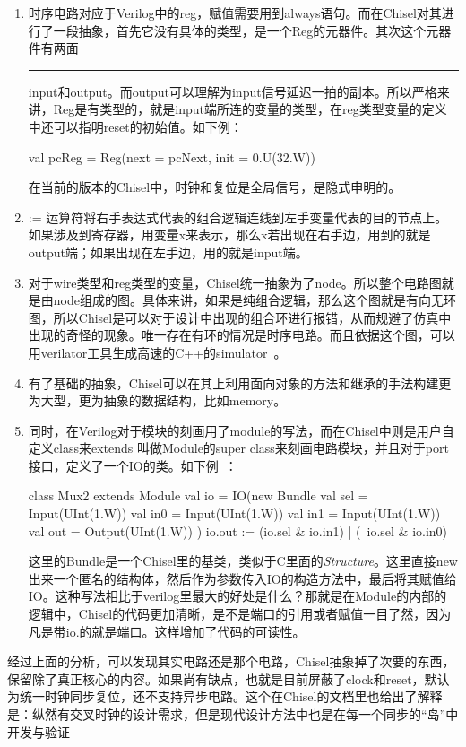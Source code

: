 \documentclass{article}
\newcommand{\chinesedash}{\rule[.7ex]{\widthof{二字}}{0.5pt}}
\begin{document}
\begin{enumerate}
\begin{itemize}
	\end{itemize}
	\item 时序电路对应于Verilog中的reg，赋值需要用到always语句。而在Chisel对其进行了一段抽象，首先它没有具体的类型，是一个Reg的元器件。其次这个元器件有两面\chinesedash input和output。而output可以理解为input信号延迟一拍的副本。所以严格来讲，Reg是有类型的，就是input端所连的变量的类型，在reg类型变量的定义中还可以指明reset的初始值。如下例：
	\begin{scala}
		val pcReg = Reg(next = pcNext, init = 0.U(32.W))
	\end{scala}
	在当前的版本的Chisel中，时钟和复位是全局信号，是隐式申明的。~\cite{chisel}
	\item := 运算符将右手表达式代表的组合逻辑连线到左手变量代表的目的节点上。如果涉及到寄存器，用变量x来表示，那么x若出现在右手边，用到的就是output端；如果出现在左手边，用的就是input端。~\cite{chisel}
	\item 对于wire类型和reg类型的变量，Chisel统一抽象为了node。所以整个电路图就是由node组成的图。具体来讲，如果是纯组合逻辑，那么这个图就是有向无环图，所以Chisel是可以对于设计中出现的组合环进行报错，从而规避了仿真中出现的奇怪的现象。唯一存在有环的情况是时序电路。而且依据这个图，可以用verilator工具生成高速的C++的simulator~\cite{chisel}。
	\item 有了基础的抽象，Chisel可以在其上利用面向对象的方法和继承的手法构建更为大型，更为抽象的数据结构，比如memory。
	\item 同时，在Verilog对于模块的刻画用了module的写法，而在Chisel中则是用户自定义class来extends 叫做Module的super class来刻画电路模块，并且对于port接口，定义了一个IO的类。如下例~\cite{chisel}：
	\begin{scala}
	class Mux2 extends Module {
		val io = IO(new Bundle{
			val sel = Input(UInt(1.W))
			val in0 = Input(UInt(1.W))
			val in1 = Input(UInt(1.W))
			val out = Output(UInt(1.W))
		})
		io.out := (io.sel & io.in1) | (~io.sel & io.in0)
	}
	\end{scala}
	这里的Bundle是一个Chisel里的基类，类似于C里面的\textit{Structure}。这里直接new出来一个匿名的结构体，然后作为参数传入IO的构造方法中，最后将其赋值给IO。这种写法相比于verilog里最大的好处是什么？那就是在Module的内部的逻辑中，Chisel的代码更加清晰，是不是端口的引用或者赋值一目了然，因为凡是带io.的就是端口。这样增加了代码的可读性。
\end{enumerate}
	经过上面的分析，可以发现其实电路还是那个电路，Chisel抽象掉了次要的东西，保留除了真正核心的内容。如果尚有缺点，也就是目前屏蔽了clock和reset，默认为统一时钟同步复位，还不支持异步电路。这个在Chisel的文档里也给出了解释是：纵然有交叉时钟的设计需求，但是现代设计方法中也是在每一个同步的``岛''中开发与验证~\cite{chisel}
	
\end{document}
